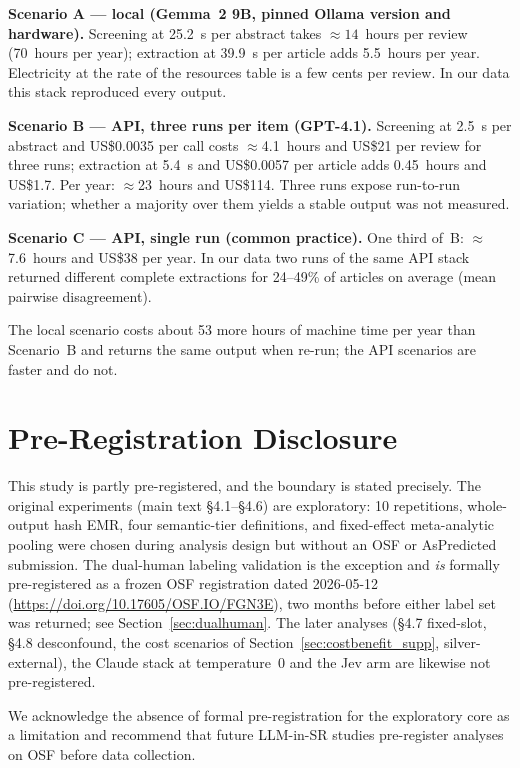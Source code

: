 \documentclass[11pt]{article}
\begin{document}
\textbf{Scenario A --- local (Gemma~2 9B, pinned Ollama version and hardware).} Screening at 25.2~s per abstract takes ${\approx}14$~hours per review (70~hours per year); extraction at 39.9~s per article adds 5.5~hours per year. Electricity at the rate of the resources table is a few cents per review. In our data this stack reproduced every output.

\textbf{Scenario B --- API, three runs per item (GPT-4.1).} Screening at 2.5~s per abstract and US\$0.0035 per call costs ${\approx}$4.1~hours and US\$21 per review for three runs; extraction at 5.4~s and US\$0.0057 per article adds 0.45~hours and US\$1.7. Per year: ${\approx}$23~hours and US\$114. Three runs expose run-to-run variation; whether a majority over them yields a stable output was not measured.

\textbf{Scenario C --- API, single run (common practice).} One third of~B: ${\approx}$7.6~hours and US\$38 per year. In our data two runs of the same API stack returned different complete extractions for 24--49\% of articles on average (mean pairwise disagreement).

\noindent The local scenario costs about 53 more hours of machine time per year than Scenario~B and returns the same output when re-run; the API scenarios are faster and do not.

\section{Pre-Registration Disclosure}
\label{sec:prereg_supp}

This study is partly pre-registered, and the boundary is stated precisely. The original experiments (main text \S4.1--\S4.6) are exploratory: 10 repetitions, whole-output hash EMR, four semantic-tier definitions, and fixed-effect meta-analytic pooling were chosen during analysis design but without an OSF or AsPredicted submission. The dual-human labeling validation is the exception and \emph{is} formally pre-registered as a frozen OSF registration dated 2026-05-12 (\url{https://doi.org/10.17605/OSF.IO/FGN3E}), two months before either label set was returned; see Section~\ref{sec:dualhuman}. The later analyses (\S4.7 fixed-slot, \S4.8 desconfound, the cost scenarios of Section~\ref{sec:costbenefit_supp}, silver-external), the Claude stack at temperature~0 and the Jev arm are likewise not pre-registered.

We acknowledge the absence of formal pre-registration for the exploratory core as a limitation and recommend that future LLM-in-SR studies pre-register analyses on OSF before data collection.
\end{document}

